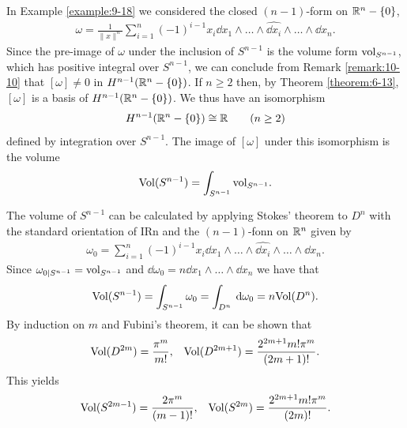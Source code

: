 \begin{example}\label{example:10-11}
  In Example \ref{example:9-18} we considered the closed $(n -1)$-form on ${\mathbb{R}}^n-\{0\}$,
  \begin{align*}
    \omega = \frac{1}{\|x\|^n} \sum_{i=1}^{n }{(-1)^{i-1}x_i\dd x_1\wedge\ldots\wedge\widehat{\dd x_i}\wedge\ldots\wedge\dd x_n}.
  \end{align*}
  Since the pre-image of $\omega$ under the inclusion of $S^{n-1}$ is the volume form $\mathrm{vol}_{S^{n-1}}$,
  which has positive integral over $S^{n-1}$, we can conclude from Remark \ref{remark:10-10} that
  $[\omega]\neq 0$ in $H^{n-1} ({\mathbb{R}}^n -\{0\})$. If $n\ge 2$ then, by Theorem \ref{theorem:6-13}, $[\omega]$ 
  is a basis of $H^{n-1} ({\mathbb{R}}^n -\{0\})$. We thus have an isomorphism
  \begin{align*}
    H^{n-1} ({\mathbb{R}}^n -\{0\})\cong {\ensuremath{\mathbb{R}}}\qquad (n\ge 2)
  \end{align*}
  defined by integration over $S^{n-1}$. The image of $[\omega]$ under this isomorphism is
  the volume
  \begin{align*}
    \mathrm{Vol}(S^{n-1}) = \int_{S^{n-1}} \mathrm{vol}_{S^{n-1}}.
  \end{align*}
\end{example}

\begin{example}\label{example:10-12}
  The volume of $S^{n-1}$ can be calculated by applying Stokes' theorem to $D^n$ with the 
  standard orientation of IRn and the $(n - 1)$-fonn on ${\mathbb{R}}^n$ given by
  \begin{align*}
    \omega_0 = \sum_{i=1}^{n}{(-1)^{i-1}x_i \dd x_1\wedge\ldots\wedge\widehat{\dd x_i}\wedge\ldots\wedge\dd x_n}.
  \end{align*}
  Since $\omega_{0|S^{n-1}} = \mathrm{vol}_{S^{n-1}}$ and $\dd\omega_0 = n\dd x_1\wedge\ldots\wedge\dd x_n$ we have that 
  \begin{align*}
    \R{Vol}(S^{n-1}) 
    = \int_{S^{n-1}}\omega_0
    = \int_{D^n}\dd\omega_0
    = n\R{Vol}(D^n).
  \end{align*}
  By induction on $m$ and Fubini's theorem, it can be shown that
  \begin{align*}
    \mathrm{Vol}(D^{2m}) = \frac{\pi^{m}}{m!}, && 
    \mathrm{Vol}(D^{2m+1}) = \frac{2^{2m+1}m!\pi^{m}}{(2m+1)!}.
  \end{align*}
  This yields
  \begin{align*}
    \mathrm{Vol}(S^{2m-1}) = \frac{2\pi^{m}}{(m-1)!}, &&
    \mathrm{Vol}(S^{2m}) = \frac{2^{2m+1}m!\pi^{m}}{(2m)!}.
  \end{align*}
\end{example}

